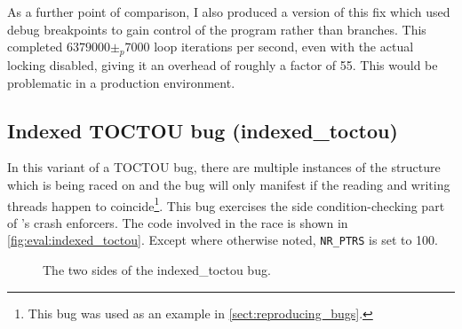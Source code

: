 As a further point of comparison, I also produced a version of this
fix which used debug breakpoints to gain control of the program rather
than branches.  This completed $6379000 \pm_p 7000$ loop iterations per
second, even with the actual locking disabled, giving it an overhead
of roughly a factor of 55.  This would be problematic in a production
environment.

\subsection{Indexed TOCTOU bug (indexed\_toctou)}

\label{sect:eval:indexed_toctou}

In this variant of a TOCTOU bug, there are multiple instances of the
structure which is being raced on and the bug will only manifest if
the reading and writing threads happen to coincide\footnote{This bug
  was used as an example in \autoref{sect:reproducing_bugs}.}.  This
bug exercises the side condition-checking part of {\technique}'s crash
enforcers.  The code involved in the race is shown in
\autoref{fig:eval:indexed_toctou}.  Except where otherwise noted,
\verb|NR_PTRS| is set to 100.

\begin{figure}
  \caption{The two sides of the indexed\_toctou bug.}
  \label{fig:eval:indexed_toctou}
\end{figure}

